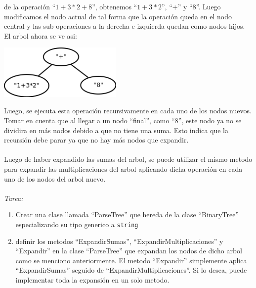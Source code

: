 \documentclass{article}
\begin{document}
de la operaci\'on  ``$1+3*2+8$'', obtenemos ``$1+3*2$'', ``$+$'' y ``$8$''. Luego
modificamos el nodo actual de tal forma que la operaci\'on queda en el nodo central
y las sub-operaciones a la derecha e izquierda quedan como nodos hijos. El arbol
ahora se ve asi:
\\
\begin{center}
        \includegraphics[width=6cm]{3ptree.png}
\end{center}
Luego, se ejecuta esta operaci\'on recursivamente en cada uno de los nodos nuevos.
Tomar en cuenta que al llegar a un nodo ``final'', como ``$8$'', este nodo ya no
se dividira en m\'as nodos debido a que no tiene una suma. Esto indica que la
recursi\'on debe parar ya que no hay m\'as nodos que expandir.
\\\\
Luego de haber expandido las sumas del arbol, se puede utilizar el mismo metodo
para expandir las multiplicaciones del arbol aplicando dicha operaci\'on en
cada uno de los nodos del arbol nuevo.
\\\\
\emph{Tarea:} 
\begin{enumerate}
        \item{Crear una clase llamada ``ParseTree'' que hereda de la clase
        ``BinaryTree'' especializando su tipo generico a \texttt{string}}
        \item{definir los metodos ``ExpandirSumas'', ``ExpandirMultiplicaciones'' y
        ``Expandir'' en la clase ``ParseTree'' que expandan los
        nodos de dicho arbol como se menciono anteriormente. El metodo ``Expandir'' simplemente
        aplica ``ExpandirSumas'' seguido de ``ExpandirMultiplicaciones''. Si lo desea, puede
        implementar toda la expansi\'on en un solo metodo.}
\end{enumerate}
\end{document}
